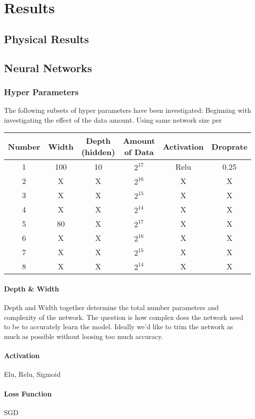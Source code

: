 \chapter{Results}
	\section{Physical Results}
	\section{Neural Networks}
		\subsection{Hyper Parameters}
			The following subsets of hyper parameters have been investigated:
			Beginning with investigating the effect of the data amount. Using same network size per 
			\begin{tabular}{c||c|c|c|c|c}
				Number & Width & Depth (hidden) & Amount of Data & Activation & Droprate \\
				\hline \hline
				1 & 100 & 10 & $2^17$ & Relu & 0.25\\
				2 & X & X & $2^16$ & X & X \\
				3 & X & X & $2^15$ & X & X \\
				4 & X & X & $2^14$ & X & X \\
				5 & 80 & X & $2^17$ & X & X \\
				6 & X & X & $2^16$ & X & X \\
				7 & X & X & $2^15$ & X & X \\
				8 & X & X & $2^14$ & X & X \\
			\end{tabular}
			\subsubsection{Depth \& Width}
				Depth and Width together determine the total number parameters and complexity of the network. The question is how complex does the network need to be to accurately learn the model. Ideally we'd like to trim the network as much as possible without loosing too much accuracy.\\
			\subsubsection{Activation}
				Elu, Relu, Sigmoid
			\subsubsection{Loss Function}
				SGD
